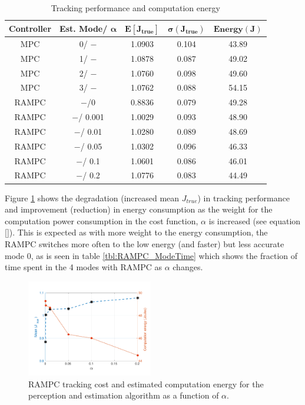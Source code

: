 \begin{table}[htb]
\begin{center}
\caption{Tracking performance and computation energy}
\label{tbl:RAMPC_MPC_performance}
\begin{tabular} {|c|c|c|c|c|}
	\hline
	\textbf{Controller} &\textbf{Est. Mode}/ $\pmb{\alpha}$ & $\pmb{E[J_{true}]}$ & $\pmb{\sigma({J_{true}})}$ & $\pmb{Energy(J)}$ \\ \hline
	MPC & 0/ $-$ & 1.0903 & 0.104 & 43.89\\ \hline
	MPC & 1/ $-$ & 1.0878 & 0.087 & 49.02 \\ \hline
	MPC & 2/ $-$ & 1.0760 & 0.098 & 49.60 \\ \hline
	MPC & 3/ $-$ & 1.0762 & 0.088 & 54.15 \\ \hline
	RAMPC &  $-$/0 & 0.8836 & 0.079 & 49.28 \\ \hline
	RAMPC & $-$/ 0.001 & 1.0029 & 0.093 & 48.90  \\ \hline
	RAMPC & $-$/ 0.01 & 1.0280 & 0.089 & 48.69  \\ \hline
	RAMPC & $-$/ 0.05 &1.0302 & 0.096 & 46.33 \\ \hline
	RAMPC & $-$/ 0.1 &1.0601 & 0.086 & 46.01 \\ \hline
	RAMPC & $-$/ 0.2 & 1.0776 & 0.083 & 44.49 \\ \hline
\end{tabular}	
	\end{center}
\end{table}



Figure \ref{fig:CostAndEnergyVsAlpha} shows the degradation (increased mean $J_{true}$) in tracking performance and improvement (reduction) in energy consumption as the weight for the computation power consumption in the cost function, $\alpha$ is increased (see equation \ref{}). This is expected as with more weight to the energy consumption, the RAMPC switches more often to the low energy (and faster) but less accurate mode 0, as is seen in table \ref{tbl:RAMPC_ModeTime} which shows the fraction of time spent in the 4 modes with RAMPC as $\alpha$ changes.


\begin{figure}[t]
	\centering
	\includegraphics[width=0.49\textwidth,scale=0.7]{figures/CostAndEnergyVsAlpha}
        \vspace{-20pt}
	\caption{RAMPC tracking cost and estimated computation energy for the perception and estimation algorithm as a function of $\alpha$. }
	\label{fig:CostAndEnergyVsAlpha}
\end{figure}


